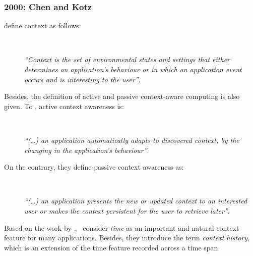 \subsubsection{2000: Chen and Kotz}
\label{sec:chen}

\citet{chen_survey_2000} define context as follows: 

\begin{description}
  \item[] \hfill \\
  \begin{mdframed}[hidealllines=true,backgroundcolor=gray!20]
  \textit{``Context is the set of environmental states and settings that either 
  determines an application’s behaviour or in which an application event occurs 
  and is interesting to the user''}.
  \end{mdframed}
\end{description}

Besides, the definition of active and passive context-aware computing is also 
given. To \citeauthor{chen_survey_2000}, active context awareness is:

\begin{description}
  \item[] \hfill \\
  \begin{mdframed}[hidealllines=true,backgroundcolor=gray!20]
  \textit{``(\dots) an application automatically adapts to discovered context, by the 
  changing in the application's behaviour''}.
  \end{mdframed}
\end{description}

On the contrary, they define passive context awareness as:

\begin{description}
  \item[] \hfill \\
  \begin{mdframed}[hidealllines=true,backgroundcolor=gray!20]
  \textit{``(\dots) an application presents the new or updated context to an interested
  user or makes the context persistent for the user to retrieve later''}.
  \end{mdframed}
\end{description}

Based on the work by~\citet{schilit_context_aware_1994},~\citet{chen_survey_2000}
consider \textit{time} as an important and natural context feature for many 
applications. Besides, they introduce the term \textit{context history}, which 
is an extension of the time feature recorded across a time span.

